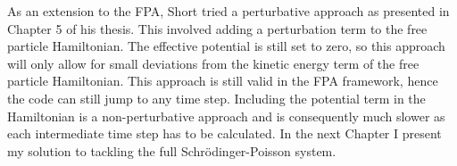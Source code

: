 As an extension to the FPA, Short tried a perturbative approach as presented in Chapter 5 of his thesis. This involved adding a perturbation term to the free particle Hamiltonian. The effective potential is still set to zero, so this approach will only allow for small deviations from the kinetic energy term of the free particle Hamiltonian. This approach is still valid in the FPA framework, hence the code can still jump to any time step. Including the potential term in the Hamiltonian is a non-perturbative approach and is consequently much slower as each intermediate time step has to be calculated. In the next Chapter I present my solution to tackling the full Schr\"odinger-Poisson system.



